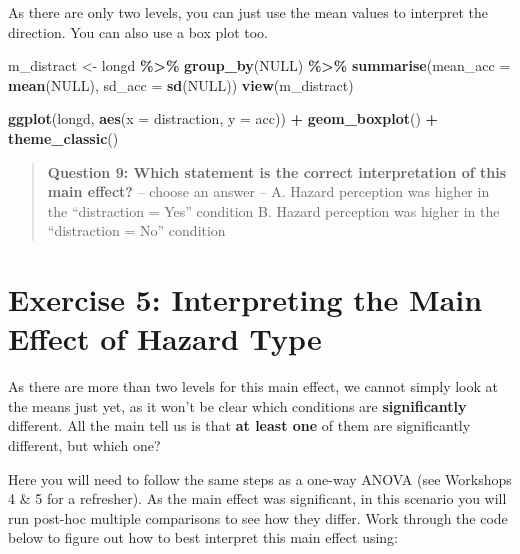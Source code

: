 \documentclass[
]{book}
\newenvironment{Shaded}{\begin{snugshade}}{\end{snugshade}}
\newcommand{\AttributeTok}[1]{\textcolor[rgb]{0.13,0.29,0.53}{#1}}
\newcommand{\ConstantTok}[1]{\textcolor[rgb]{0.56,0.35,0.01}{#1}}
\newcommand{\FunctionTok}[1]{\textcolor[rgb]{0.13,0.29,0.53}{\textbf{#1}}}
\newcommand{\NormalTok}[1]{#1}
\newcommand{\OtherTok}[1]{\textcolor[rgb]{0.56,0.35,0.01}{#1}}
\newcommand{\SpecialCharTok}[1]{\textcolor[rgb]{0.81,0.36,0.00}{\textbf{#1}}}
\let\oldsection\section
\renewcommand{\section}{\needspace{5\baselineskip}\oldsection}
\begin{document}
As there are only two levels, you can just use the mean values to interpret the direction. You can also use a box plot too.

\begin{Shaded}
\begin{Highlighting}[]
\NormalTok{m\_distract }\OtherTok{\textless{}{-}}\NormalTok{ longd }\SpecialCharTok{\%\textgreater{}\%}
  \FunctionTok{group\_by}\NormalTok{(}\ConstantTok{NULL}\NormalTok{) }\SpecialCharTok{\%\textgreater{}\%}
    \FunctionTok{summarise}\NormalTok{(}\AttributeTok{mean\_acc =} \FunctionTok{mean}\NormalTok{(}\ConstantTok{NULL}\NormalTok{),}
              \AttributeTok{sd\_acc =} \FunctionTok{sd}\NormalTok{(}\ConstantTok{NULL}\NormalTok{))}
\FunctionTok{view}\NormalTok{(m\_distract)}

\FunctionTok{ggplot}\NormalTok{(longd, }\FunctionTok{aes}\NormalTok{(}\AttributeTok{x =}\NormalTok{ distraction, }\AttributeTok{y =}\NormalTok{ acc)) }\SpecialCharTok{+}
  \FunctionTok{geom\_boxplot}\NormalTok{() }\SpecialCharTok{+}
  \FunctionTok{theme\_classic}\NormalTok{()}
\end{Highlighting}
\end{Shaded}

\begin{quote}
\textbf{Question 9: Which statement is the correct interpretation of this main effect?} -- choose an answer -- A. Hazard perception was higher in the ``distraction = Yes'' condition B. Hazard perception was higher in the ``distraction = No'' condition
\end{quote}

\section{Exercise 5: Interpreting the Main Effect of Hazard Type}\label{exercise-5-interpreting-the-main-effect-of-hazard-type}

As there are more than two levels for this main effect, we cannot simply look at the means just yet, as it won't be clear which conditions are \textbf{significantly} different. All the main tell us is that \textbf{at least one} of them are significantly different, but which one?

Here you will need to follow the same steps as a one-way ANOVA (see Workshops 4 \& 5 for a refresher). As the main effect was significant, in this scenario you will run post-hoc multiple comparisons to see how they differ. Work through the code below to figure out how to best interpret this main effect using:
\end{document}
